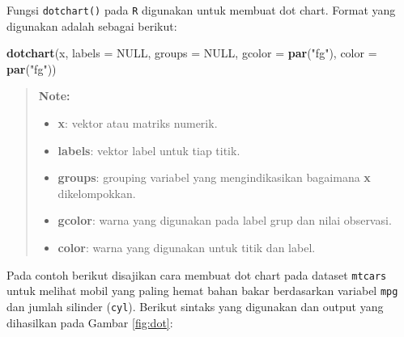 \documentclass[]{book}
\newenvironment{Shaded}{\begin{snugshade}}{\end{snugshade}}
\newcommand{\KeywordTok}[1]{\textcolor[rgb]{0.13,0.29,0.53}{\textbf{#1}}}
\newcommand{\DataTypeTok}[1]{\textcolor[rgb]{0.13,0.29,0.53}{#1}}
\newcommand{\StringTok}[1]{\textcolor[rgb]{0.31,0.60,0.02}{#1}}
\newcommand{\OtherTok}[1]{\textcolor[rgb]{0.56,0.35,0.01}{#1}}
\newcommand{\NormalTok}[1]{#1}
\providecommand{\tightlist}{%
  \setlength{\itemsep}{0pt}\setlength{\parskip}{0pt}}
\begin{document}
Fungsi \texttt{dotchart()} pada \texttt{R} digunakan untuk membuat dot
chart. Format yang digunakan adalah sebagai berikut:

\begin{Shaded}
\begin{Highlighting}[]
\KeywordTok{dotchart}\NormalTok{(x, }\DataTypeTok{labels =} \OtherTok{NULL}\NormalTok{, }\DataTypeTok{groups =} \OtherTok{NULL}\NormalTok{, }
         \DataTypeTok{gcolor =} \KeywordTok{par}\NormalTok{(}\StringTok{"fg"}\NormalTok{), }\DataTypeTok{color =} \KeywordTok{par}\NormalTok{(}\StringTok{"fg"}\NormalTok{))}
\end{Highlighting}
\end{Shaded}

\begin{quote}
\textbf{Note: }

\begin{itemize}
\tightlist
\item
  \textbf{x}: vektor atau matriks numerik.
\item
  \textbf{labels}: vektor label untuk tiap titik.
\item
  \textbf{groups}: grouping variabel yang mengindikasikan bagaimana
  \textbf{x} dikelompokkan.
\item
  \textbf{gcolor}: warna yang digunakan pada label grup dan nilai
  observasi.
\item
  \textbf{color}: warna yang digunakan untuk titik dan label.
\end{itemize}
\end{quote}

Pada contoh berikut disajikan cara membuat dot chart pada dataset
\texttt{mtcars} untuk melihat mobil yang paling hemat bahan bakar
berdasarkan variabel \texttt{mpg} dan jumlah silinder (\texttt{cyl}).
Berikut sintaks yang digunakan dan output yang dihasilkan pada Gambar
\ref{fig:dot}:
\end{document}
